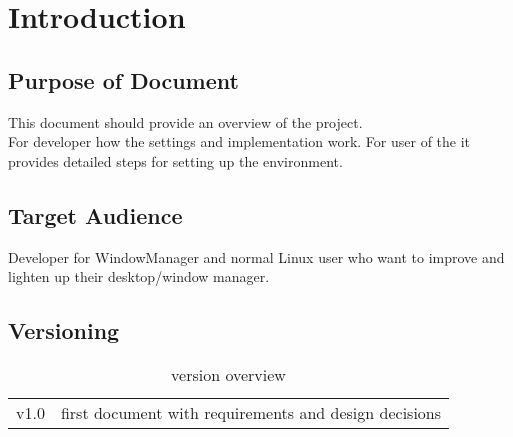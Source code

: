 	\section{Introduction}
        \subsection{Purpose of Document}
		This document should provide an overview of the \project project.\\ For developer how the settings and implementation work. For user of the \project it provides detailed steps for setting up the environment.
		
        \subsection{Target Audience}
        Developer for WindowManager and normal Linux user who want to improve and lighten up their desktop/window manager.
		
		\subsection{Versioning}
		\begin{table}[H]
			\centering
			\tableformat
			\begin{tabular}{c|l}
			v1.0 & first document with requirements and design decisions\\
			\end{tabular}
			\label{version table}
			\caption{version overview}
		\end{table}
		
